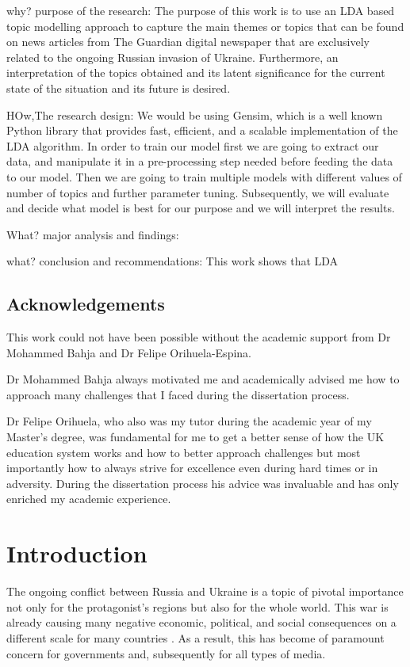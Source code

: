 \documentclass[twoside,12pt,a4paper]{article}
\begin{document}
why? purpose of the research:
The purpose of this work is to use an LDA based topic modelling approach to capture the main themes or topics that can be found on news articles from The Guardian digital newspaper that are exclusively related to the ongoing Russian invasion of Ukraine. Furthermore, an interpretation of the topics obtained and its latent significance for the current state of the situation and its future is desired.

HOw,The research design:
We would be using Gensim, which is a well known Python library that provides fast, efficient, and a scalable implementation of the LDA algorithm. In order to train our model first we are going to extract our data, and manipulate it in a pre-processing step needed before feeding the data to our model. Then we are going to train multiple models with different values of number of topics and further parameter tuning. Subsequently, we will evaluate and decide what model is best for our purpose and we will interpret the results.

What? major analysis and findings:


what? conclusion and recommendations:
This work shows that LDA 

\subsection{Acknowledgements}
This work could not have been possible without the academic support from Dr Mohammed Bahja and Dr Felipe Orihuela-Espina.

Dr Mohammed Bahja always motivated me and academically advised me how to approach many challenges that I faced during the dissertation process.

Dr Felipe Orihuela, who also was my tutor during the academic year of my Master's degree, was fundamental for me to get a better sense of how the UK education system works and how to better approach challenges but most importantly how to always strive for excellence even during hard times or in adversity. During the dissertation process his advice was invaluable and has only enriched my academic experience.

\clearpage
\section{Introduction}
The ongoing conflict between Russia and Ukraine is a topic of pivotal importance not only for the protagonist's regions but also for the whole world. This war is already causing many negative economic, political, and social consequences on a different scale for many countries \citep{caldara_effect_2022}. As a result, this has become of paramount concern for governments and, subsequently for all types of media.
\end{document}
